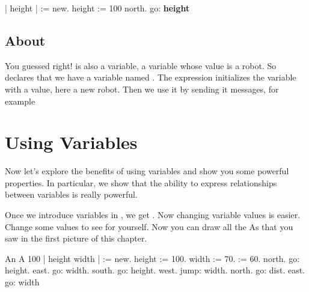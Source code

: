 \begin{nalltt}
| \caro height |
\caro := \Turtle new.
height := 100
\caro north.
\caro go: \textbf{height}
\end{nalltt}



\subsection*{About \caro}
You guessed right! \caro is also a variable, a variable whose value is a robot. \newcommand{\replace}[2]{Hence,}{So} \ct{| \caro |} declares that we \newcommand{\replace}[2]{use}{have} a variable named \ct{\caro}. The expression  initializes the variable with a value, here a new robot. Then we use it by sending  it messages, for example 

\section{Using Variables}
Now \newcommand{\replace}[2]{let us}{let's} explore the benefits of using variables and show you some powerful properties. In particular, we show that \newcommand{\replace}[2]{been able}{the ability} to express relationships between variables is really powerful.  

Once we introduce variables in \newcommand{\remove}[1]{the} , we \newcommand{\replace}[2]{obtain the}{get}
. Now changing variable values is easier. Change some values to \newcommand{\replace}[2]{convince you}{see for yourself}. \newcommand{\replace}[2]{You should be able to}{Now you can} draw all the As that \newcommand{\replace}[2]{are drawn}{you saw} in the first picture of this chapter.

\begin{scriptwithtitle}{An A \newcommand{\remove}[1]{of} 100\newcommand{\add}[1]{ pixels high}}\label{src:a100var}
| \caro height width \dist|
\caro := \Turtle new.
height := 100.
width := 70.
\dist := 60.
\caro north.
\caro go: height.
\caro east.
\caro go: width.
\caro south.
\caro go: height.
\caro west.
\caro jump: width.
\caro north.
\caro go: dist.
\caro east.
\caro go: width
\end{scriptwithtitle}


